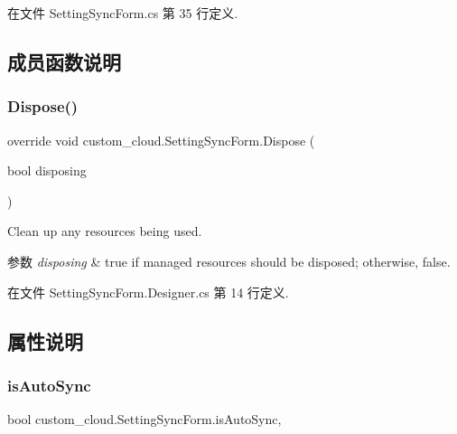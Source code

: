 在文件 Setting\+Sync\+Form.\+cs 第 35 行定义.



\subsection{成员函数说明}
\mbox{\label{classcustom__cloud_1_1_setting_sync_form_a0740a406ce7daf056744bed691f4afc6}} 
\subsubsection{\texorpdfstring{Dispose()}{Dispose()}}
{\footnotesize\ttfamily override void custom\+\_\+cloud.\+Setting\+Sync\+Form.\+Dispose (\begin{DoxyParamCaption}\item[{bool}]{disposing }\end{DoxyParamCaption})\hspace{0.3cm}{\ttfamily [protected]}}



Clean up any resources being used. 


\begin{DoxyParams}{参数}
{\em disposing} & true if managed resources should be disposed; otherwise, false.\\
\hline
\end{DoxyParams}


在文件 Setting\+Sync\+Form.\+Designer.\+cs 第 14 行定义.



\subsection{属性说明}
\mbox{\label{classcustom__cloud_1_1_setting_sync_form_ae122f79caf78c5af0d52c25d60488559}} 
\subsubsection{\texorpdfstring{is\+Auto\+Sync}{isAutoSync}}
{\footnotesize\ttfamily bool custom\+\_\+cloud.\+Setting\+Sync\+Form.\+is\+Auto\+Sync\hspace{0.3cm}{\ttfamily [get]}, {\ttfamily [set]}}



